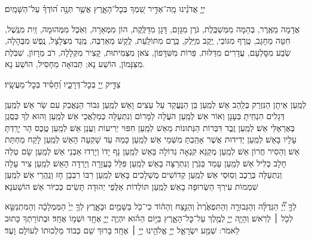 \documentclass[twoside, openany, parskip=half, 11pt]{book}
\begin{document}
יְיָ֤ אֲדֹנֵ֗ינוּ מָֽה־אַדִּ֣יר שִׁ֭מְךָ בְּכׇל־הָאָ֑רֶץ אֲשֶׁ֥ר תְּנָ֥ה ה֝וֹדְךָ֗ עַל־הַשָּׁמָֽיִם׃

אֲדָמָה מֵאֶֽרֶר, בְּהֵמָה מִמְּשַׁכֶּֽלֶת, גֹּרֶן מִגָּזָם, דָּגָן מִדַּלֶּֽקֶת, הוֹן מִמְּאֵרָה, וְאֹֽכֶל מִמְּהוּמָה, זַֽיִת מִנֶּֽשֶׁל, חִטָּה מֵחָגָב, טֶֽרֶף מִגּוֹבַי, יֶֽקֶב מִיֶּֽלֶק, כֶּֽרֶם מִתּוֹלַֹֽעַת, לֶֽקֶשׁ מֵאַרְבֶּה, מֶֽגֶד מִצְּלָצָל, נֶֽפֶשׁ מִבֶּהָלָה, שֹֹֹֽבַע מִסׇּלְעָם, עֲדָרִים מִדַּלּוּת, פֵּרוֹת מִשִּׁדָּפוֹן, צֹאן מִצְּמִיתוּת, קָצִיר מִקְּלָלָה, רֹב מֵרָזוֹן, שִׁבֹּֽלֶת מִצִּנָּמוֹן, הוֹשַׁע נָא; תְּבוּאָה מֵחָסִיל, הוֹשַׁע נָא. 

צַדִּ֣יק יְ֖יָ בְּכׇל־דְּרָכָ֑יו וְ֝חָסִ֗יד בְּכׇל־מַעֲשָֽׂיו׃

לְמַֽעַן אֵיתָן הַנִּזְרַק בְּלַֽהַב אֵשׁ׃ לְמַֽעַן בֵּן הַנֶּעֱקַד עַל עֵצִים וָאֵשׁ׃ לְמַֽעַן גִּבּוֹר הַנֶּאֱבַק עִם שַׂר אֵשׁ׃ לְמַֽעַן דְּגָלִים הִנְחִֽיתָ בְּעָנָן וְאוֹר אֵשׁ׃ לְמַֽעַן הֹעֲלָה לַמָּרוֹם וְנִתְעַלָּה כְּמַלְאֲכֵי אֵשׁ׃ לְמַֽעַן וְהוּא לְךָ כְּסֶֽגֶן בְּאֶרְאֶלֵּי אֵשׁ׃ לְמַֽעַן זֶֽבֶד דִּבְּרוֹת הַנְּתוּנוֹת מֵאֵשׁ לְמַֽעַן חִפּוּי יְרִיעוֹת וַעֲנַן אֵשׁ׃ לְמַֽעַן טֶֽכֶס הָר יָרַֽדְתָּ עָלָיו בָּאֵשׁ׃ לְמַֽעַן יְדִידוּת אֲשֶׁר אָהַֽבְתָּ מִשְּׁמֵי אֵשׁ׃ לְמַֽעַן כָּמַהּ עַד שָׁקְעָה הָאֵשׁ לְמַֽעַן לָקַח מַחְתַּת אֵשׁ׃ וְהֵסִיר חֲרוֹן אֵשׁ׃ לְמַֽעַן מְקַנֵּא קִנְאָה גְדוֹלָה בָּאֵשׁ לְמַֽעַן נָף יָדוֹ וְיָרְדוּ אַבְנֵי אֵשׁ׃ לְמַֽעַן שָׂם טְלֵה חָלָב כְּלִיל אֵשׁ׃ לְמַֽעַן עָמַד בַּגֹּֽרֶן וְנִתְרַצָּה בָאֵשׁ׃ לְמַֽעַן פִּלֵּל בָּעֲזָרָה וְיָרְדָה הָאֵשׁ׃ לְמַֽעַן צִיר עָלָה וְנִתְעַלָּה בְּרֶֽכֶב וְסֽוּסֵי אֵשׁ׃ לְמַֽעַן קְדוֹשִׁים מֻשְׁלָכִים בָּאֵשׁ׃ לְמַֽעַן רִבּוֹ רִבְבָן חָז וְנַֽהֲרֵי אֵשׁ׃
לְמַֽעַן שִׁמְמוֹת עִירְךָ הַשְּׂרוּפָה בָאֵשׁ׃
לְמַֽעַן תּוֹלְדוֹת אַלֻּפֵי יְהוּדָה תָּשִׂים כְּכִיּוֹר אֵשׁ׃ הוֹשַׁענָא׃

לְךָ֣ יְ֠יָ֠ הַגְּדֻלָּ֨ה וְהַגְּבוּרָ֤ה וְהַתִּפְאֶ֙רֶת֙ וְהַנֵּ֣צַח וְהַה֔וֹד כִּי־כֹ֖ל בַּשָּׁמַ֣יִם וּבָאָ֑רֶץ לְךָ֤ יְיָ֙ הַמַּמְלָכָ֔ה וְהַמִּתְנַשֵּׂ֖א לְכֹ֥ל ׀ לְרֹֽאשׁ׃  וְהָיָ֧ה יְיָ֛ לְמֶ֖לֶךְ עַל־כׇּל־הָאָ֑רֶץ בַּיּ֣וֹם הַה֗וּא יִהְיֶ֧ה יְיָ֛ אֶחָ֖ד וּשְׁמ֥וֹ אֶחָֽד׃ וּבְתוֹרָתְךָ כָּתוּב לֵאמֹר: שְׁמַ֖ע יִשְׂרָאֵ֑ל יְיָ֥ אֱלֹהֵ֖ינוּ יְיָ֥ ׀ אֶחָֽד׃ בָּרוּךְ שֵׁם כְּבוֹד מַלְכוּתוֹ לְעוֹלָם וָעֶד׃

\aniveho
\end{document}
